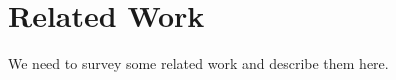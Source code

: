 \section{Related Work}\label{sec:related}
We need to survey some related work and describe them here.
